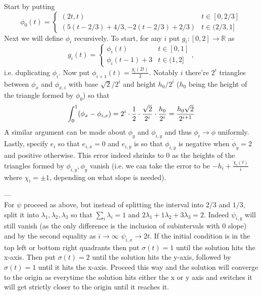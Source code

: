 \documentclass{article}
\newenvironment{ex}[1]
  {\renewcommand\theexercise{#1}\exercise}
  {\endexercise}
\begin{document}
\begin{ex}{1.11}
  Start by putting
  $$
  \phi_{0}(t) = \begin{cases}
    (2t, t) & t \in [0, 2/3] \\
    (5(t-2/3) + 4/3, -2(t-2/3) + 2/3) & t \in (2/3, 1]
  \end{cases}
  $$
  Next we will define $\phi_i$ recursively. To start, for any  $i$ put $g_i : [0, 2] \to \mathbb{R}$ as
  $$
  g_i(t) = \begin{cases}
    \phi_i(t) & t \in [0, 1] \\
    \phi_i(t-1) + 3 & t \in (1, 2]
  \end{cases},
  $$
  i.e. duplicating $\phi_i$. Now put $\phi_{i+1}(t) = \frac{g_i(2t)}{2}$. Notably $i$ there're $2^i$ triangles between $\phi_x$ and $\phi_{x, i}$ with base $\sqrt{2}/2^i$ and height $h_0 / 2^i$ ($h_0$ being the height of the triangle formed by $\phi_0$) so that
  $$
  \int_0^1 (\phi_x - \phi_{i,x}) = 2^i \cdot \frac{1}{2} \cdot \frac{\sqrt{2}}{2^i} \cdot \frac{h_0}{2^i} = \frac{h_0\sqrt{2}}{2^{i+1}}
  $$
  A similar argument can be made about $\phi_y$ and $\phi_{i, y}$ and thus $\phi_i \to \phi$ uniformly. Lastly, specify $e_i$ so that $e_{i,x} = 0$ and $e_{i,y}$ is so that $\phi_{i, y}$ is negative when $\dot{\phi}_y = 2$ and positive otherwise. This error indeed shrinks to $0$ as the heights of the triangles formed by $\phi_{i, y}, \phi_y$ vanish (i.e. we can take the error to be $-h_i + \frac{\chi_i(t)}{i}$ where $\chi_i = \pm 1$, depending on what slope is needed).

  --- \, \\
  For $\psi$ proceed as above, but instead of splitting the interval into $2/3$ and $1/3$, split it into $\lambda_1, \lambda_2, \lambda_3$ so that $\sum_i \lambda_i = 1$ and $2 \lambda_1 + 1\lambda_2 + 3\lambda_3 = 2$. Indeed $\psi_{i, y}$ will still vanish (as the only difference is the inclusion of subintervals with $0$ slope) and by the second equality as $i \to \infty$ $\psi_{i, x} \to 2t$.
\end{ex}
\begin{ex}{1.14}
  If the initial condition is in the top left or bottom right quadrants then put $\sigma(t) = 1$ until the solution hits the x-axis. Then put $\sigma(t) = 2$ until the solution hits the y-axis, followed by $\sigma(t) = 1$ until it hits the x-axis. Proceed this way and the solution will converge to the origin as everytime the solution hits either the x or y axis and switches it will get strictly closer to the origin until it reaches it.
\end{ex}
\end{document}
